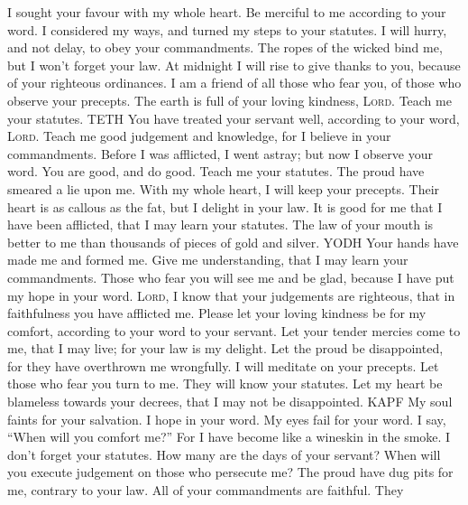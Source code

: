  I sought your favour with my whole heart. Be merciful to
me according to your word.  I considered my ways, and
turned my steps to your statutes.  I will hurry, and not
delay, to obey your commandments.  The ropes of the
wicked bind me, but I won't forget your law.  At midnight
I will rise to give thanks to you, because of your righteous ordinances.
 I am a friend of all those who fear you, of those who
observe your precepts.  The earth is full of your loving
kindness, \textsc{Lord}. Teach me your statutes. TETH 
You have treated your servant well, according to your word,
\textsc{Lord}.  Teach me good judgement and knowledge,
for I believe in your commandments.  Before I was
afflicted, I went astray; but now I observe your word. 
You are good, and do good. Teach me your statutes.  The
proud have smeared a lie upon me. With my whole heart, I will keep your
precepts.  Their heart is as callous as the fat, but I
delight in your law.  It is good for me that I have been
afflicted, that I may learn your statutes.  The law of
your mouth is better to me than thousands of pieces of gold and silver.
YODH  Your hands have made me and formed me. Give me
understanding, that I may learn your commandments.  Those
who fear you will see me and be glad, because I have put my hope in your
word.  \textsc{Lord}, I know that your judgements are
righteous, that in faithfulness you have afflicted me. 
Please let your loving kindness be for my comfort, according to your
word to your servant.  Let your tender mercies come to
me, that I may live; for your law is my delight.  Let the
proud be disappointed, for they have overthrown me wrongfully. I will
meditate on your precepts.  Let those who fear you turn
to me. They will know your statutes.  Let my heart be
blameless towards your decrees, that I may not be disappointed. KAPF
 My soul faints for your salvation. I hope in your word.
 My eyes fail for your word. I say, ``When will you
comfort me?''  For I have become like a wineskin in the
smoke. I don't forget your statutes.  How many are the
days of your servant? When will you execute judgement on those who
persecute me?  The proud have dug pits for me, contrary
to your law.  All of your commandments are faithful. They
